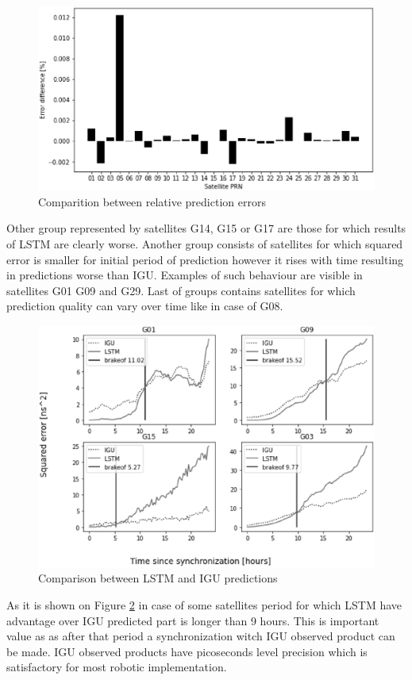 \documentclass{article}
\begin{document}
\begin{figure}[htb!] 
\centering
	\includegraphics[width=\textwidth]{figures/rel_err_diff}
\caption{Comparition between relative prediction errors}
\label{fig:relative_error_comparition}
\end{figure}

Other group represented by satellites G14, G15 or G17 are those  for which results of LSTM 
are clearly worse. Another group consists of satellites for which 
squared error is smaller for initial period of prediction however it rises with time resulting
in predictions worse than IGU. Examples of such behaviour are visible in satellites G01
G09 and G29. Last of groups contains satellites for which prediction quality can vary over
time like in case of G08.
\begin{figure}[htb] 
\centering
	\includegraphics[width=\textwidth]{figures/brakeoff_compare}
\caption{Comparison between LSTM and IGU predictions}
\label{fig:cutoff}
\end{figure}
As it is shown on Figure \ref{fig:cutoff} in case of some satellites period for which LSTM
have advantage over IGU predicted part is longer than 9 hours. This is important value as 
as after that period a synchronization witch IGU observed product can be made.
IGU observed products have picoseconds level precision which is satisfactory for most 
robotic implementation.
\end{document}
